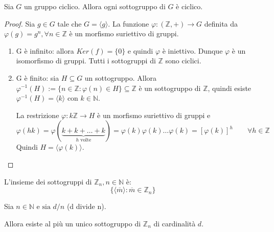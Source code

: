 \documentclass[../main.tex]{subfiles}
\begin{document}
\begin{theorem}
    Sia $G$ un gruppo ciclico. Allora ogni sottogruppo di $G$ è ciclico.
\end{theorem}

\begin{proof}
    Sia $g \in G$ tale che $G = \langle g \rangle$. La funzione $\varphi: (\mathbb{Z} , +) \rightarrow G$ definita da $\varphi(g) = g^n, \forall n \in \mathbb{Z}$ è un morfismo suriettivo di gruppi.
    \begin{enumerate}[label=\alph*)]
        \item G è infinito: allora $Ker(f) = \{0\}$ e quindi $\varphi$ è iniettivo. Dunque $\varphi$ è un
              isomorfismo di gruppi. Tutti i sottogruppi di $\mathbb{Z} $ sono ciclici.
        \item G è finito: sia $H \subseteq G$ un sottogruppo. Allora $\varphi^{-1}(H) := \{n \in \mathbb{Z} : \varphi(n) \in H\} \subseteq \mathbb{Z} $ è un sottogruppo di $\mathbb{Z} $, quindi esiste $\varphi^{-1}(H)= \langle k \rangle$ con $k \in \mathbb{N} $.

              La restrizione $\varphi: k \mathbb{Z} \rightarrow H$ è un morfismo suriettivo di gruppi e
              \begin{equation*}
                  \varphi(hk) = \varphi(\underbrace{k+k+\ldots+k}_{h \text{ volte}}) = \varphi(k) \varphi(k) \ldots \varphi(k) = [\varphi(k)]^h \qquad \forall h \in \mathbb{Z}
              \end{equation*}
              Quindi $H = \langle \varphi(k) \rangle$.
    \end{enumerate}
\end{proof}

\begin{corollary}
    L'insieme dei sottogruppi di $\mathbb{Z}_n , n \in \mathbb{N} $ è:
    \begin{equation*}
        \{\langle \overline{m} \rangle : \overline{m} \in \mathbb{Z}_n \}
    \end{equation*}
\end{corollary}

\begin{proposition}
    Sia $n \in \mathbb{N} \text{ e sia } d/n$ (d divide n).

    Allora esiste al più un unico sottogruppo di $\mathbb{Z}_n$ di cardinalità $d$.
\end{proposition}
\end{document}
